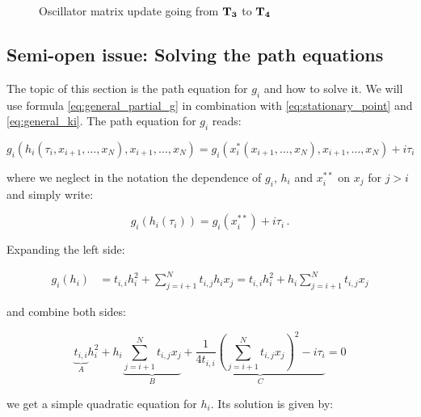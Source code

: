\documentclass[a4paper,10pt]{article}
\begin{document}
\begin{figure}
  \centering
  \subfloat[][]{
    
  }
  \qquad
  \subfloat[][]{
    
  }
\caption{Oscillator matrix update going from $\mathbf{T_3}$ to $\mathbf{T_4}$}
\label{fig:oscillator_update_T3}
\end{figure}


\subsection{Semi-open issue: Solving the path equations}

The topic of this section is the path equation for $g_i$ and how to
solve it. We will use formula \eqref{eq:general_partial_g} in combination
with \eqref{eq:stationary_point} and \eqref{eq:general_ki}. The path equation
for $g_i$ reads:

\begin{equation*}
  g_i\left(h_i\left(\tau_i, x_{i+1}, \ldots, x_N\right), x_{i+1}, \ldots, x_N\right)
  = g_i\left(x_i^{*}\left(x_{i+1}, \ldots, x_N\right), x_{i+1}, \ldots, x_N\right) + i \tau_i
\end{equation*}

where we neglect in the notation the dependence of $g_i$, $h_i$ and $x_i^{**}$ on $x_j$
for $j>i$ and simply write:

\begin{equation} \label{eq:general_path_eqn}
  g_i\left(h_i\left(\tau_i\right)\right) = g_i\left(x_i^{**}\right) + i \tau_i \,.
\end{equation}

Expanding the left side:

\begin{equation}
\begin{split}
  g_i\left(h_i\right)
  & = t_{i,i} h_i^2 + \sum_{j=i+1}^{N} t_{i,j} h_i x_j
    = t_{i,i} h_i^2 +  h_i \sum_{j=i+1}^{N} t_{i,j} x_j
\end{split}
\end{equation}

and combine both sides:

\begin{equation}
  \underbrace{t_{i,i}}_{A} h_i^2
  +
  h_i \underbrace{\sum_{j=i+1}^{N} t_{i,j} x_j}_{B}
  +
  \underbrace{\frac{1}{4 t_{i,i}} \left( \sum_{j=i+1}^{N} t_{i,j} x_j \right)^2 - i \tau_i}_{C}
  = 0
\end{equation}

we get a simple quadratic equation for $h_i$. Its solution
is given by:
\end{document}
